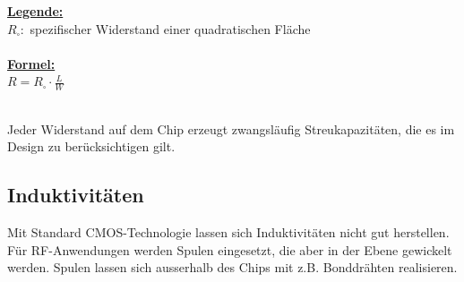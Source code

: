 \begin{minipage}[c]{0.45\textwidth}
	\uline{\textbf{Legende:}}\\
	$R_\square:$ spezifischer Widerstand einer quadratischen Fläche\\\\
	\uline{\textbf{Formel:}}\\
	$R = R_\square \cdot \frac{L}{W}$
\end{minipage}
\\[2ex]
Jeder Widerstand auf dem Chip erzeugt zwangsläufig Streukapazitäten, die es im Design zu berücksichtigen gilt.

\subsection{Induktivitäten}
Mit Standard CMOS-Technologie lassen sich Induktivitäten nicht gut herstellen.
Für RF-Anwendungen werden Spulen eingesetzt, die aber in der Ebene gewickelt werden.
Spulen lassen sich ausserhalb des Chips mit z.B. Bonddrähten realisieren.